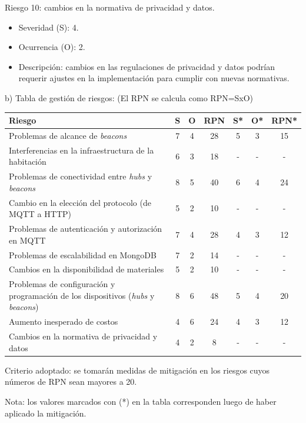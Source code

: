 \documentclass[
11pt, %
]{charter}
\begin{document}
Riesgo 10: cambios en la normativa de privacidad y datos.
\begin{itemize}
	\item Severidad (S): 4.
	\item Ocurrencia (O): 2.
	\item Descripción: cambios en las regulaciones de privacidad y datos podrían requerir ajustes en la implementación para cumplir con nuevas normativas.
\end{itemize}

b) Tabla de gestión de riesgos:      (El RPN se calcula como RPN=SxO)

\begin{table}[htpb]
\centering
\begin{tabularx}{\linewidth}{@{}|X|c|c|c|c|c|c|@{}}
\hline
\rowcolor[HTML]{C0C0C0} 
Riesgo & S & O & RPN & S* & O* & RPN* \\ \hline
Problemas de alcance de \textit{beacons} & 7 & 4 & 28 & 5 & 3 & 15     \\ \hline
Interferencias en la infraestructura de la habitación & 6 & 3 & 18 & - & - & -      \\ \hline
Problemas de conectividad entre \textit{hubs} y \textit{beacons} & 8 & 5 & 40 & 6 & 4 & 24      \\ \hline
Cambio en la elección del protocolo (de MQTT a HTTP) & 5 & 2 & 10 & - & - & -      \\ \hline
Problemas de autenticación y autorización en MQTT & 7 & 4 & 28 & 4 & 3 & 12      \\ \hline
Problemas de escalabilidad en MongoDB&  7 &  2 &  14   &   - & - & -       \\ \hline
Cambios en la disponibilidad de materiales& 5  & 2  &   10  &  - & - & -       \\ \hline
Problemas de configuración y programación de los dispositivos (\textit{hubs} y \textit{beacons})& 8  & 6  &    48 & 5 & 4 & 20      \\ \hline
Aumento inesperado de costos       & 4  &  6 &  24   &  4  & 3   &   12   \\ \hline
Cambios en la normativa de privacidad y datos       & 4  &  2 &   8  &  - & - & -       \\ \hline
\end{tabularx}%
\end{table}

Criterio adoptado: 
se tomarán medidas de mitigación en los riesgos cuyos números de RPN sean mayores a 20.

Nota: los valores marcados con (*) en la tabla corresponden luego de haber aplicado la mitigación.
\end{document}
